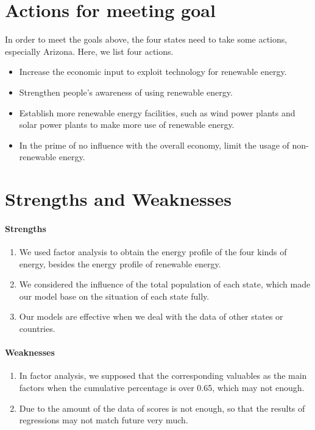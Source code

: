 \documentclass[a4paper,11pt]{article}
\begin{document}
\section{Actions for meeting goal}
\par In order to meet the goals above, the four states need to take some actions, especially Arizona. Here, we list four actions.
\begin{itemize}
    \item Increase the economic input to exploit technology for renewable energy. 
    \item Strengthen people's awareness of using renewable energy.
    \item Establish more renewable energy facilities, such as wind power plants and solar power plants to make more use of renewable energy.
    \item In the prime of no influence with the overall economy, limit the usage of non-renewable energy.
\end{itemize}

    



    




\section{Strengths and Weaknesses}

\paragraph{Strengths}
\text{\\}
\begin{enumerate}%
\renewcommand{\labelenumi}{(\theenumi)}
    \item We used factor analysis to obtain the energy profile of the four kinds of energy, besides the energy profile of renewable energy.
    \item We considered the influence of the total population of each state, which made our model base on the situation of each state fully.
    \item Our models are effective when we deal with the data of other states or countries.
\end{enumerate}


\paragraph{Weaknesses}
\begin{enumerate}%
\renewcommand{\labelenumi}{(\theenumi)}
    \item In factor analysis, we supposed that the corresponding valuables as the main factors when the cumulative percentage is over 0.65, which may not enough.
    \item Due to the amount of the data of scores is not enough, so that the results of regressions may not match future very much.
\end{enumerate}
\end{document}
